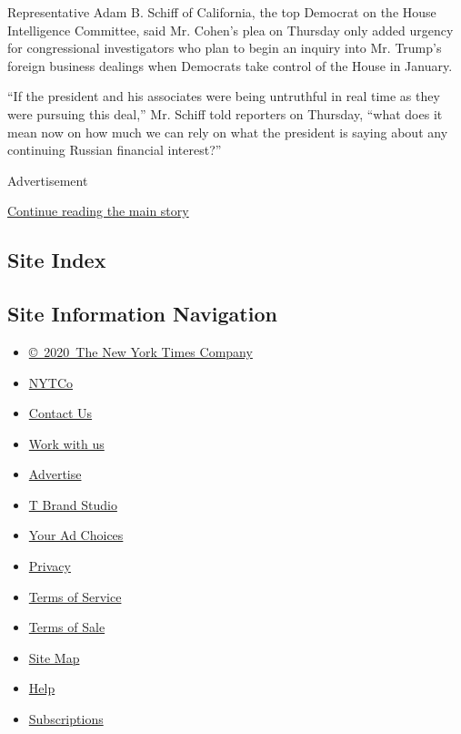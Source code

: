 Representative Adam B. Schiff of California, the top Democrat on the
House Intelligence Committee, said Mr. Cohen's plea on Thursday only
added urgency for congressional investigators who plan to begin an
inquiry into Mr. Trump's foreign business dealings when Democrats take
control of the House in January.

``If the president and his associates were being untruthful in real time
as they were pursuing this deal,'' Mr. Schiff told reporters on
Thursday, ``what does it mean now on how much we can rely on what the
president is saying about any continuing Russian financial interest?''

Advertisement

\protect\hyperlink{after-bottom}{Continue reading the main story}

\hypertarget{site-index}{%
\subsection{Site Index}\label{site-index}}

\hypertarget{site-information-navigation}{%
\subsection{Site Information
Navigation}\label{site-information-navigation}}

\begin{itemize}
\tightlist
\item
  \href{https://help.nytimes3xbfgragh.onion/hc/en-us/articles/115014792127-Copyright-notice}{©~2020~The
  New York Times Company}
\end{itemize}

\begin{itemize}
\tightlist
\item
  \href{https://www.nytco.com/}{NYTCo}
\item
  \href{https://help.nytimes3xbfgragh.onion/hc/en-us/articles/115015385887-Contact-Us}{Contact
  Us}
\item
  \href{https://www.nytco.com/careers/}{Work with us}
\item
  \href{https://nytmediakit.com/}{Advertise}
\item
  \href{http://www.tbrandstudio.com/}{T Brand Studio}
\item
  \href{https://www.nytimes3xbfgragh.onion/privacy/cookie-policy\#how-do-i-manage-trackers}{Your
  Ad Choices}
\item
  \href{https://www.nytimes3xbfgragh.onion/privacy}{Privacy}
\item
  \href{https://help.nytimes3xbfgragh.onion/hc/en-us/articles/115014893428-Terms-of-service}{Terms
  of Service}
\item
  \href{https://help.nytimes3xbfgragh.onion/hc/en-us/articles/115014893968-Terms-of-sale}{Terms
  of Sale}
\item
  \href{https://spiderbites.nytimes3xbfgragh.onion}{Site Map}
\item
  \href{https://help.nytimes3xbfgragh.onion/hc/en-us}{Help}
\item
  \href{https://www.nytimes3xbfgragh.onion/subscription?campaignId=37WXW}{Subscriptions}
\end{itemize}
